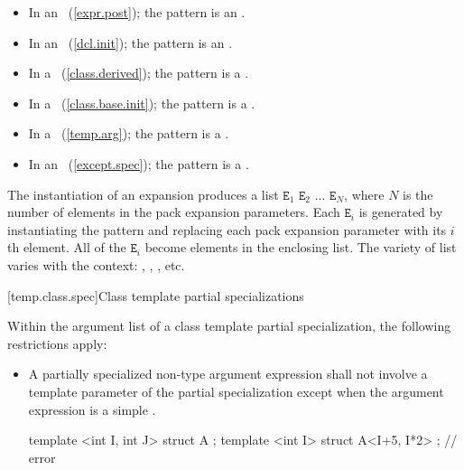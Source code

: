 \documentclass[american]{book}
\begin{document}
\begin{paras}
\begin{itemize}
\item In an \mbox{}~(\mbox{\ref{expr.post}});
the pattern is an \mbox{}.
\item In an \mbox{}~(\mbox{\ref{dcl.init}});
the pattern is an \mbox{}.
\item In a \mbox{}~(\mbox{\ref{class.derived}});
the pattern is a \mbox{}.
\item In a \mbox{}~(\mbox{\ref{class.base.init}});
the pattern is a \mbox{}.
\item In a \mbox{}~(\mbox{\ref{temp.arg}});
the pattern is a \mbox{}.
\item In an \mbox{}~(\mbox{\ref{except.spec}});
the pattern is a \mbox{}.
\end{itemize}

\setcounter{Paras}{5}
\pnum
The instantiation of an expansion produces a 
list $\texttt{E}_1$\changedConcepts{,}{\mbox{$\oplus$}} $\texttt{E}_2$\changedConcepts{,}{\mbox{$\oplus$}} $...$\changedConcepts{,}{\mbox{$\oplus$}} $\texttt{E}_N$, where
$N$ is the number of elements in the pack expansion
parameters. Each
\mbox{$\texttt{E}_i$} is generated by instantiating the pattern and
replacing each pack expansion parameter with its \mbox{$i$}th element.
All of the \mbox{$\texttt{E}_i$} become elements in the enclosing list.
\mbox{\enternote} The variety of list varies with the context:
\mbox{},
\mbox{},
\mbox{}, 
 etc. \mbox{\exitnote}

\setcounter{subsection}{4}
[temp.class.spec]{Class template partial specializations}
\setcounter{Paras}{8}

\textcolor{black}{}\pnum
Within the argument list of a class template partial specialization,
the following restrictions apply:

\begin{itemize}
\item
A partially specialized non-type argument expression shall not involve
a template parameter of the partial specialization except when the argument
expression is a simple
.
\enterexample\ 
\begin{codeblock}
template <int I, int J> struct A {};
template <int I> struct A<I+5, I*2> {}; // error


\end{codeblock}
\end{itemize}
\end{paras}
\end{document}
